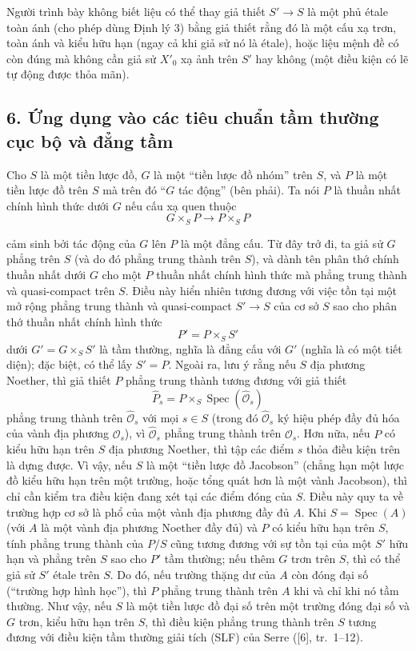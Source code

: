  Người trình bày không biết liệu có thể thay giả thiết
$S'\longrightarrow S$ là một phủ étale toàn ánh (cho phép dùng Định lý 3) bằng
giả thiết rằng đó là một cấu xạ trơn, toàn ánh và kiểu hữu hạn (ngay cả khi giả
sử nó là étale), hoặc liệu mệnh đề có còn đúng mà không cần giả sử $X'_0$ xạ
ảnh trên $S'$ hay không (một điều kiện có lẽ tự động được thỏa mãn).

\subsection*{6. Ứng dụng vào các tiêu chuẩn tầm thường cục bộ và đẳng tầm}

Cho $S$ là một tiền lược đồ, $G$ là một ``tiền lược đồ nhóm'' trên $S$, và $P$
là một tiền lược đồ trên $S$ mà trên đó ``$G$ tác động'' (bên phải). Ta nói
$P$ là thuần nhất chính hình thức dưới $G$ nếu cấu xạ quen thuộc
\[
  G\times_SP\longrightarrow P\times_SP
\]

cảm sinh bởi tác động của $G$ lên $P$ là một đẳng cấu. Từ đây trở đi, ta giả
sử $G$ phẳng trên $S$ (và do đó phẳng trung thành trên $S$), và dành tên
phân thớ chính thuần nhất dưới $G$ cho một $P$ thuần nhất chính hình thức
mà phẳng trung thành và quasi-compact trên $S$. Điều này hiển nhiên tương đương
với việc tồn tại một mở rộng phẳng trung thành và quasi-compact
$S'\longrightarrow S$ của cơ sở $S$ sao cho phân thớ thuần nhất chính hình thức
\[
  P'=P\times_SS'
\]
dưới $G'=G\times_SS'$ là tầm thường, nghĩa là đẳng cấu với $G'$ (nghĩa là có
một tiết diện); đặc biệt, có thể lấy $S'=P$. Ngoài ra, lưu ý rằng nếu $S$ địa
phương Noether, thì giả thiết $P$ phẳng trung thành tương đương với
giả thiết
\[
  \widehat P_s=P\times_S\operatorname{Spec}(\widehat{\mathcal O}_s)
\]
phẳng trung thành trên $\widehat{\mathcal O}_s$ với mọi $s\in S$ (trong đó
$\widehat{\mathcal O}_s$ ký hiệu phép đầy đủ hóa của vành địa phương
$\mathcal O_s$), vì $\widehat{\mathcal O}_s$ phẳng trung thành trên
$\mathcal O_s$. Hơn nữa, nếu $P$ có kiểu hữu hạn trên $S$ địa phương Noether,
thì tập các điểm $s$ thỏa điều kiện trên là dựng được. Vì vậy, nếu $S$ là một
``tiền lược đồ Jacobson'' (chẳng hạn một lược đồ kiểu hữu hạn trên một trường,
hoặc tổng quát hơn là một vành Jacobson), thì chỉ cần kiểm tra điều kiện
đang xét tại các điểm đóng của $S$. Điều này quy ta về trường hợp cơ sở là phổ
của một vành địa phương đầy đủ $A$. Khi $S=\operatorname{Spec}(A)$ (với $A$ là
một vành địa phương Noether đầy đủ) và $P$ có kiểu hữu hạn trên $S$, tính phẳng
trung thành của $P/S$ cũng tương đương với sự tồn tại của một $S'$ hữu hạn và
phẳng trên $S$ sao cho $P'$ tầm thường; nếu thêm $G$ trơn trên $S$, thì có thể
giả sử $S'$ étale trên $S$. Do đó, nếu trường thặng dư của $A$ còn đóng đại số
(``trường hợp hình học''), thì $P$ phẳng trung thành trên $A$ khi và chỉ khi nó
tầm thường. Như vậy, nếu $S$ là một tiền lược đồ đại số trên một trường đóng
đại số và $G$ trơn, kiểu hữu hạn trên $S$, thì điều kiện phẳng trung thành trên
$S$ tương đương với điều kiện tầm thường giải tích (SLF) của Serre ([6],
tr.~1--12).

